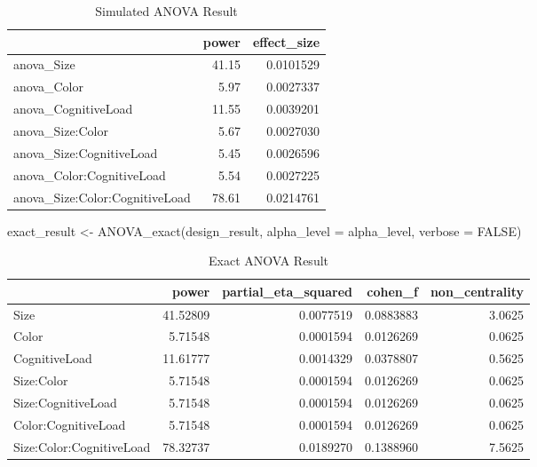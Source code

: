 \documentclass[
]{book}
\newenvironment{Shaded}{\begin{snugshade}}{\end{snugshade}}
\newcommand{\AttributeTok}[1]{\textcolor[rgb]{0.77,0.63,0.00}{#1}}
\newcommand{\ConstantTok}[1]{\textcolor[rgb]{0.00,0.00,0.00}{#1}}
\newcommand{\FunctionTok}[1]{\textcolor[rgb]{0.00,0.00,0.00}{#1}}
\newcommand{\NormalTok}[1]{#1}
\newcommand{\OtherTok}[1]{\textcolor[rgb]{0.56,0.35,0.01}{#1}}
\begin{document}
\begin{table}[!h]

\caption{\label{tab:unnamed-chunk-191}Simulated ANOVA Result}
\centering
\begin{tabular}[t]{l|r|r}
\hline
  & power & effect\_size\\
\hline
anova\_Size & 41.15 & 0.0101529\\
\hline
anova\_Color & 5.97 & 0.0027337\\
\hline
anova\_CognitiveLoad & 11.55 & 0.0039201\\
\hline
anova\_Size:Color & 5.67 & 0.0027030\\
\hline
anova\_Size:CognitiveLoad & 5.45 & 0.0026596\\
\hline
anova\_Color:CognitiveLoad & 5.54 & 0.0027225\\
\hline
anova\_Size:Color:CognitiveLoad & 78.61 & 0.0214761\\
\hline
\end{tabular}
\end{table}

\begin{Shaded}
\begin{Highlighting}[]
\NormalTok{exact\_result }\OtherTok{\textless{}{-}} \FunctionTok{ANOVA\_exact}\NormalTok{(design\_result,}
                            \AttributeTok{alpha\_level =}\NormalTok{ alpha\_level,}
                            \AttributeTok{verbose =} \ConstantTok{FALSE}\NormalTok{)}
\end{Highlighting}
\end{Shaded}

\begin{table}[!h]

\caption{\label{tab:unnamed-chunk-193}Exact ANOVA Result}
\centering
\begin{tabular}[t]{l|r|r|r|r}
\hline
  & power & partial\_eta\_squared & cohen\_f & non\_centrality\\
\hline
Size & 41.52809 & 0.0077519 & 0.0883883 & 3.0625\\
\hline
Color & 5.71548 & 0.0001594 & 0.0126269 & 0.0625\\
\hline
CognitiveLoad & 11.61777 & 0.0014329 & 0.0378807 & 0.5625\\
\hline
Size:Color & 5.71548 & 0.0001594 & 0.0126269 & 0.0625\\
\hline
Size:CognitiveLoad & 5.71548 & 0.0001594 & 0.0126269 & 0.0625\\
\hline
Color:CognitiveLoad & 5.71548 & 0.0001594 & 0.0126269 & 0.0625\\
\hline
Size:Color:CognitiveLoad & 78.32737 & 0.0189270 & 0.1388960 & 7.5625\\
\hline
\end{tabular}
\end{table}
\end{document}
